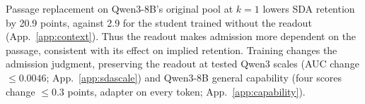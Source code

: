 Passage replacement on Qwen3-8B's original pool at $k=1$ lowers SDA retention by 20.9 points, against 2.9 for the student trained without the readout (App.~\ref{app:context}). Thus the readout makes admission more dependent on the passage, consistent with its effect on implied retention. Training changes the admission judgment, preserving the readout at tested Qwen3 scales (AUC change $\le0.0046$; App.~\ref{app:sdascale}) and Qwen3-8B general capability (four scores change $\le0.3$ points, adapter on every token; App.~\ref{app:capability}).
